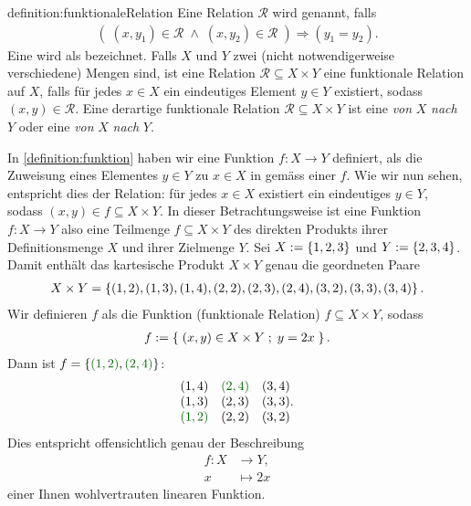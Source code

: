 \begin{definition}{definition:funktionaleRelation}
Eine Relation $\mathcal{R}$ wird  genannt, falls
\begin{align*}
    (\;(x,y_1)\in\mathcal{R}\;\land\; (x,y_2)\in\mathcal{R}\;) \Rightarrow (y_1=y_2).
\end{align*}
Eine  wird als  bezeichnet. Falls $X$ und $Y$ zwei (nicht notwendigerweise verschiedene) Mengen sind, ist eine Relation $\mathcal{R}\subseteq X\times Y$ eine funktionale Relation auf $X$, falls für jedes $x\in X$ ein eindeutiges Element $y\in Y$ existiert, sodass $(x,y)\in\mathcal{R}$. Eine derartige funktionale Relation $\mathcal{R}\subseteq X\times Y$ ist eine  \textit{von} $X$ \textit{nach} $Y$ oder eine  \textit{von} $X$ \textit{nach} $Y$.
\end{definition}
In \cref{definition:funktion} haben wir eine Funktion $f:X\to Y$ definiert, als die Zuweisung eines Elementes $y\in Y$  zu $x\in X$ in gemäss einer  $f$. Wie wir nun sehen, entspricht dies der Relation: für jedes $x\in X$ existiert ein eindeutiges $y\in Y$, sodass $(x,y)\in f\subseteq X\times Y$. In dieser Betrachtungsweise ist eine Funktion $f: X\to Y$ also eine Teilmenge $f\subseteq X\times Y$ des direkten Produkts ihrer Definitionsmenge $X$ und ihrer Zielmenge $Y$.
\beispiel{-}
{
    Sei $X:=\left\{1,2,3\right\}$ und $Y:=\left\{2,3,4\right\}$. Damit enthält das kartesische Produkt $X\times Y$ genau die geordneten Paare
    \begin{align*}
        X\times Y =\left\{(1,2),(1,3),(1,4),(2,2),(2,3),(2,4),(3,2),(3,3),(3,4)\right\}.
    \end{align*}
    Wir definieren $f$ als die Funktion (funktionale Relation) $f\subseteq X\times Y$, sodass
    \begin{align*}
        f := \left\{\;(x,y)\in X\times Y \; ; \; y=2x \;\right\}.
    \end{align*}
    Dann ist $f =\lrc{\textcolor{DarkGreen}{(1,2)},\textcolor{DarkGreen}{(2,4)}}$:
    \begin{align*}
        \begin{matrix*}[r]
            (1,4) & \textcolor{DarkGreen}{(2,4)} & (3,4)\\
            (1,3) & (2,3) & (3,3)\\
            \textcolor{DarkGreen}{(1,2)} & (2,2) & (3,2)\\
        \end{matrix*}.
    \end{align*}
    Dies entspricht offensichtlich genau der Beschreibung
    \begin{align*}
        f: X &\to Y,\\
        x &\mapsto 2x
    \end{align*}
einer Ihnen wohlvertrauten linearen Funktion.
}

